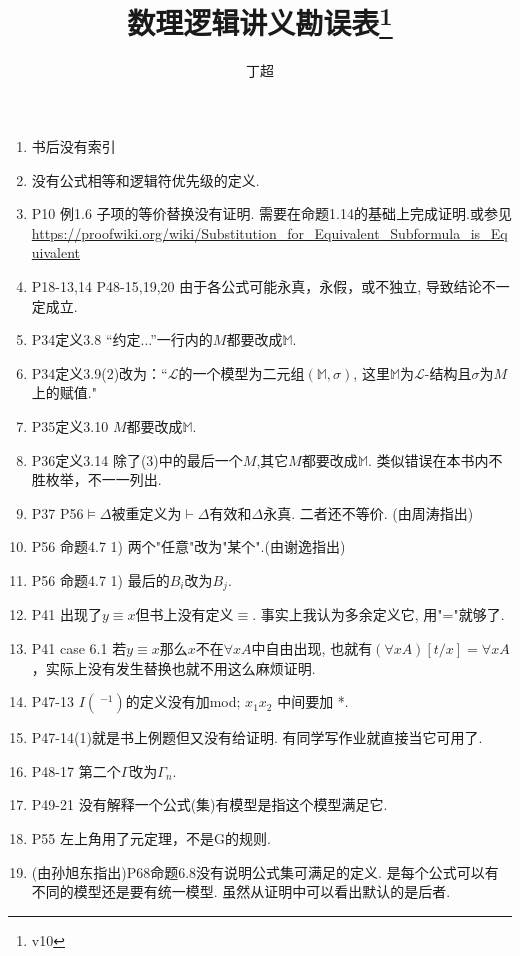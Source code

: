 \documentclass{article}
\begin{document}
\title{数理逻辑讲义勘误表\footnote{v10}}
\author{丁超}
\maketitle	
\begin{enumerate}
\item 书后没有索引
\item 没有公式相等和逻辑符优先级的定义. 
\item P10 例1.6 子项的等价替换没有证明. 需要在命题1.14的基础上完成证明.或参见\\ \url{https://proofwiki.org/wiki/Substitution_for_Equivalent_Subformula_is_Equivalent}
\item P18-13,14 P48-15,19,20 由于各公式可能永真，永假，或不独立, 导致结论不一定成立. 
\item P34定义3.8 “约定...”一行内的$M$都要改成$\mathbb{M}$. 
\item P34定义3.9(2)改为：“$\mathscr{L}$的一个模型为二元组$(\mathbb{M},\sigma)$, 这里$\mathbb{M}$为$\mathscr{L}$-结构且$\sigma$为$M$上的赋值."
\item P35定义3.10 $M$都要改成$\mathbb{M}$. 
\item P36定义3.14 除了(3)中的最后一个$M$,其它$M$都要改成$\mathbb{M}$. 类似错误在本书内不胜枚举，不一一列出. 
\item P37 P56$\models \Delta$被重定义为$\vdash \Delta$有效和$\Delta$永真. 二者还不等价. (由周涛指出)
\item P56 命题4.7 1) 两个"任意"改为"某个".(由谢逸指出)
\item P56 命题4.7 1) 最后的\(B_i\)改为\(B_j\).
\item P41 出现了$y\equiv x$但书上没有定义$\equiv$. 事实上我认为多余定义它, 用"="就够了. 
\item P41 case 6.1 若$y\equiv x$那么$x$不在$\forall xA$中自由出现, 也就有$(\forall xA)[t/x] = \forall xA$，实际上没有发生替换也就不用这么麻烦证明. 
\item P47-13 $I(~^{-1})$的定义没有加mod; $x_1x_2$ 中间要加 *. 
\item P47-14(1)就是书上例题但又没有给证明. 有同学写作业就直接当它可用了. 
\item P48-17 第二个$\Gamma$改为$\Gamma_n$. 
\item P49-21 没有解释一个公式(集)有模型是指这个模型满足它. 
\item P55 左上角用了元定理，不是G的规则. 
\item (由孙旭东指出)P68命题6.8没有说明公式集可满足的定义. 是每个公式可以有不同的模型还是要有统一模型. 虽然从证明中可以看出默认的是后者. 

\end{enumerate}
\end{document}
